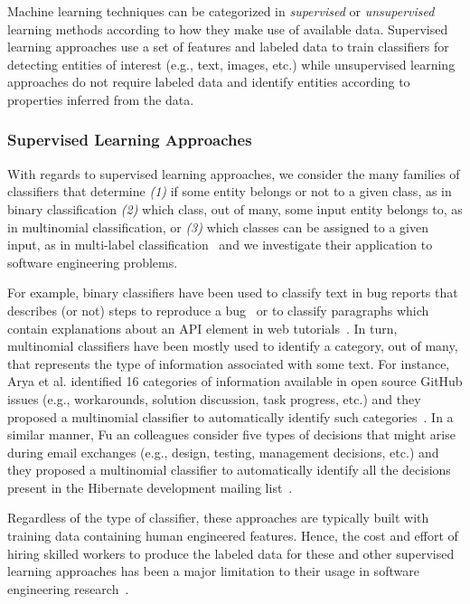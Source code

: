 Machine learning techniques can be categorized 
in \textit{supervised} or \textit{unsupervised} learning methods 
according to how they make use of available data. 
Supervised learning approaches use a set of features and labeled data
to train classifiers for detecting entities of interest (e.g., text, images, etc.)
while unsupervised learning approaches do not require labeled data and 
identify entities according to properties inferred from the data.



\subsubsection{Supervised Learning Approaches}


With regards to supervised learning approaches, 
we consider the many families of classifiers that 
determine
\textit{(1)} if some entity belongs or not to a given class, as in binary classification
\textit{(2)} which class, out of many, some input entity belongs to, as in multinomial classification, or
\textit{(3)} which classes can be assigned to a given input, as in multi-label classification~\cite{alpaydin2020ml}
and we investigate their application to software engineering problems.





For example, binary classifiers have been used 
to classify text in bug reports that describes (or not) steps to reproduce a bug~\cite{Chaparro2016}
or  to classify paragraphs which contain explanations 
about an API element  in web tutorials~\cite{Petrosyan2015}.
In turn, multinomial classifiers have been mostly used 
to identify a category, out of many, that represents the type of information 
associated with some text. For instance, Arya et al. identified 16 categories of  information available
in open source GitHub issues (e.g., workarounds, solution discussion, task progress, etc.)
and they proposed a multinomial classifier 
to automatically identify such categories~\cite{Arya2019}.
In a similar manner, Fu an colleagues consider 
five types of decisions that might arise during 
email exchanges (e.g., design, testing, management decisions, etc.)
and they proposed a multinomial classifier 
to automatically identify all the decisions present in 
the Hibernate development mailing list~\cite{fu2021}.





Regardless of the type of classifier, these approaches are typically built 
with training data containing human engineered features.
Hence, the cost and effort of hiring skilled workers to produce 
the labeled data for these and other supervised learning approaches
has been a major limitation to their usage in software engineering research~\cite{Arpteg2018, ferreira2021}.




